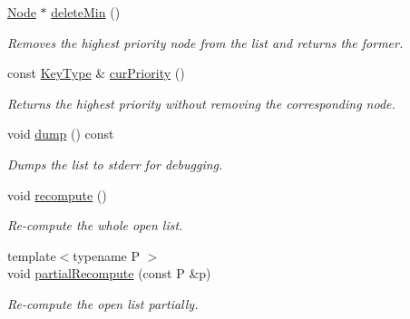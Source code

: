 \begin{DoxyCompactItemize}
\hyperlink{structslb_1_1ext_1_1policy_1_1openList_1_1BucketedStdMap__T_a20be12bd955d752d2ef9e78f7577c738}{Node} $\ast$ \hyperlink{structslb_1_1ext_1_1policy_1_1openList_1_1BucketedStdMap__T_a2e1f3b541a78adc315f5d5b7972270c7}{delete\+Min} ()
\begin{DoxyCompactList}\small\item\em Removes the highest priority node from the list and returns the former. \end{DoxyCompactList}\item 
const \hyperlink{structslb_1_1ext_1_1policy_1_1openList_1_1BucketedStdMap__T_a1236fe314465155339798c0f9c4c5ca8}{Key\+Type} \& \hyperlink{structslb_1_1ext_1_1policy_1_1openList_1_1BucketedStdMap__T_a17ebc907dda46e3bf1644ef741b3a898}{cur\+Priority} ()
\begin{DoxyCompactList}\small\item\em Returns the highest priority without removing the corresponding node. \end{DoxyCompactList}\item 
void \hyperlink{structslb_1_1ext_1_1policy_1_1openList_1_1BucketedStdMap__T_a4b2b0f37366941cf0424f39c597d7f6f}{dump} () const \hypertarget{structslb_1_1ext_1_1policy_1_1openList_1_1BucketedStdMap__T_a4b2b0f37366941cf0424f39c597d7f6f}{}\label{structslb_1_1ext_1_1policy_1_1openList_1_1BucketedStdMap__T_a4b2b0f37366941cf0424f39c597d7f6f}

\begin{DoxyCompactList}\small\item\em Dumps the list to {\ttfamily stderr} for debugging. \end{DoxyCompactList}\item 
void \hyperlink{structslb_1_1ext_1_1policy_1_1openList_1_1BucketedStdMap__T_a2bb00c5ed704472eea8da59ec2fd8bc1}{recompute} ()
\begin{DoxyCompactList}\small\item\em Re-\/compute the whole open list. \end{DoxyCompactList}\item 
{\footnotesize template$<$typename P $>$ }\\void \hyperlink{structslb_1_1ext_1_1policy_1_1openList_1_1BucketedStdMap__T_a6c49ce7f49fb94bc6d2ecf3be26554d4}{partial\+Recompute} (const P \&p)
\begin{DoxyCompactList}\small\item\em Re-\/compute the open list partially. \end{DoxyCompactList}\end{DoxyCompactItemize}
